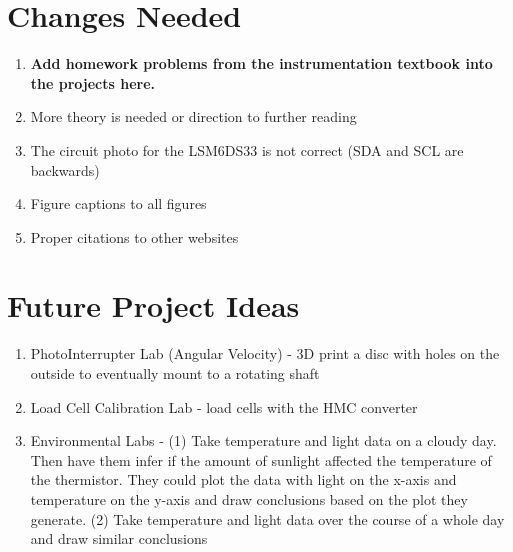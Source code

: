 \section{Changes Needed}
\begin{enumerate}[itemsep=-5pt]
\item {\bf Add homework problems from the instrumentation textbook into the projects here.}
\item More theory is needed or direction to further reading 
\item The circuit photo for the LSM6DS33 is not correct (SDA and SCL are backwards)
\item Figure captions to all figures
\item Proper citations to other websites
\end{enumerate}

\section{Future Project Ideas}
\begin{enumerate}[itemsep=-5pt]
\item PhotoInterrupter Lab (Angular Velocity) - 3D print a disc with holes on the outside to eventually mount to a rotating shaft  
\item Load Cell Calibration Lab - load cells with the HMC converter
\item Environmental Labs - (1) Take temperature and light data on a cloudy day. Then have them infer if the amount of sunlight affected the temperature of the thermistor. They could plot the data with light on the x-axis and temperature on the y-axis and draw conclusions based on the plot they generate. (2) Take temperature and light data over the course of a whole day and draw similar conclusions
\end{enumerate}
